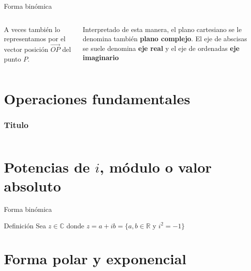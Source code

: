 \begin{frame}[c]{Forma binómica}
  \begin{columns}
      A veces también lo representamos por el vector posición
      $\overrightarrow{OP}$ del punto $P$.

      \vspace{\baselineskip}
      Interpretado de esta manera, el plano cartesiano se le denomina
      también \textbf{plano complejo}. El eje de abscisas se suele denomina
      \textbf{eje real} y el eje de ordenadas \textbf{eje imaginario}
  \end{columns}
\end{frame}

\section{Operaciones fundamentales}

\begin{frame}[fragile]
  \frametitle{Titulo}

  \vspace{\baselineskip}
  \begin{lstlisting}[language=Python]
  \end{lstlisting}
\end{frame}

\section{Potencias de $i$, módulo o valor absoluto}

\begin{frame}[c]{Forma binómica}
  \begin{block}{Definición}
  Sea $z \in \mathbb{C}$ donde $z = a + ib = \{ a,b \in \mathbb{R}$ y $ i^2
  = -1 \}$
  \end{block}
\end{frame}

\section{Forma polar y exponencial}

